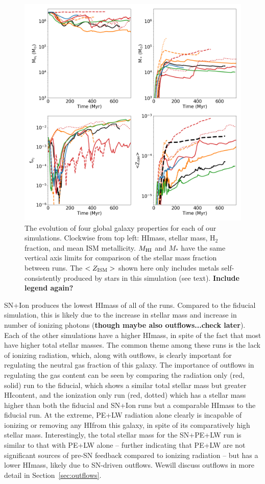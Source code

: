 \documentclass[twocolumn]{aastex62}
\newcommand{\radstyle}{red, solid}
\newcommand{\ionstyle}{red, dotted}
\newcommand{\HI}{HI}
\begin{document}
\begin{figure}
  \centering
  \includegraphics[width=0.98\linewidth]{figures/physics_comparison_masses}
  \caption{The evolution of four global galaxy properties for each of our simulations. Clockwise from top left: \HI mass, stellar mass, H$_2$ fraction, and mean ISM metallicity. $M_{\rm \HI}$ and $M_{*}$ have the same vertical axis limits for comparison of the stellar mass fraction between runs. The $<Z_{\rm ISM}>$ shown here only includes metals self-consistently produced by stars in this simulation (see text).
  \textbf{Include legend again?}}
  \label{fig:properties}
\end{figure}

SN+Ion produces the lowest \HI mass of all of the runs. Compared to the fiducial simulation, this is likely due to the increase in stellar mass and increase in number of ionizing photons (\textbf{though maybe also outflows...check later}). Each of the other simulations have a higher \HI mass, in spite of the fact that most have higher total stellar masses. The common theme among these runs is the lack of ionizing radiation, which, along with outflows, is clearly important for regulating the neutral gas fraction of this galaxy. The importance of outflows in regulating the gas content can be seen by comparing the radiation only (\radstyle) run to the fiducial, which shows a similar total stellar mass but greater \HI content, and the ionization only run (\ionstyle) which has a stellar mass higher than both the fiducial and SN+Ion runs but a comparable \HI mass to the fiducial run. At the extreme, PE+LW radiation alone clearly is incapable of ionizing or removing any \HI from this galaxy, in spite of its comparatively high stellar mass. Interestingly, the total stellar mass for the SN+PE+LW run is similar to that with PE+LW alone -- further indicating that PE+LW are not significant sources of pre-SN feedback compared to ionizing radiation -- but has a lower \HI mass, likely due to SN-driven outflows. Wewill discuss outflows in more detail in Section~\ref{sec:outflows}.
\end{document}
